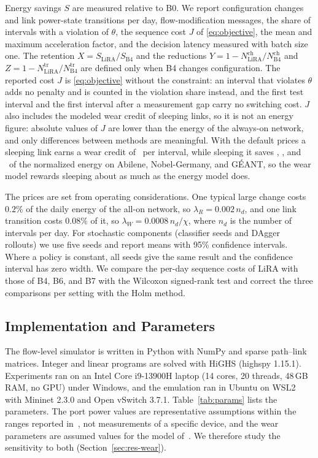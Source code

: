 \documentclass[journal]{IEEEtran}
\begin{document}
Energy savings $S$ are measured relative to B0. We report configuration changes and link power-state transitions per day, flow-modification messages, the share of intervals with a violation of $\theta$, the sequence cost $J$ of \eqref{eq:objective}, the mean and maximum acceleration factor, and the decision latency measured with batch size one. The retention $X=S_{\mathrm{LiRA}}/S_{\mathrm{B4}}$ and the reductions $Y=1-N^{\mathrm{ch}}_{\mathrm{LiRA}}/N^{\mathrm{ch}}_{\mathrm{B4}}$ and $Z=1-N^{\mathrm{tr}}_{\mathrm{LiRA}}/N^{\mathrm{tr}}_{\mathrm{B4}}$ are defined only when B4 changes configuration. The reported cost $J$ is \eqref{eq:objective} without the constraint: an interval that violates $\theta$ adds no penalty and is counted in the violation share instead, and the first test interval and the first interval after a measurement gap carry no switching cost. $J$ also includes the modeled wear credit of sleeping links, so it is not an energy figure: absolute values of $J$ are lower than the energy of the always-on network, and only differences between methods are meaningful. With the default prices a sleeping link earns a wear credit of \wearCredit\ per interval, while sleeping it saves \sleepSaveabi, \sleepSavenob, and \sleepSavegea\ of the normalized energy on Abilene, Nobel-Germany, and G\'{E}ANT, so the wear model rewards sleeping about as much as the energy model does.

The prices are set from operating considerations. One typical large change costs $0.2\%$ of the daily energy of the all-on network, so $\lambda_R=0.002\,n_d$, and one link transition costs $0.08\%$ of it, so $\lambda_W=0.0008\,n_d/\chi$, where $n_d$ is the number of intervals per day. For stochastic components (classifier seeds and DAgger rollouts) we use five seeds and report means with 95\% confidence intervals. Where a policy is constant, all seeds give the same result and the confidence interval has zero width. We compare the per-day sequence costs of LiRA with those of B4, B6, and B7 with the Wilcoxon signed-rank test and correct the three comparisons per setting with the Holm method.

\subsection{Implementation and Parameters}\label{sec:params}

The flow-level simulator is written in Python with NumPy and sparse path--link matrices. Integer and linear programs are solved with HiGHS (highspy 1.15.1). Experiments ran on an Intel Core i9-13900H laptop (14 cores, 20 threads, 48\,GB RAM, no GPU) under Windows, and the emulation ran in Ubuntu on WSL2 with Mininet 2.3.0 and Open vSwitch 3.7.1. Table~\ref{tab:params} lists the parameters. The port power values are representative assumptions within the ranges reported in~\cite{vishwanath2014modeling,mahadevan2009power}, not measurements of a specific device, and the wear parameters are assumed values for the model of~\cite{chiaraviglio2015lifetime}. We therefore study the sensitivity to both (Section~\ref{sec:res-wear}).
\end{document}
